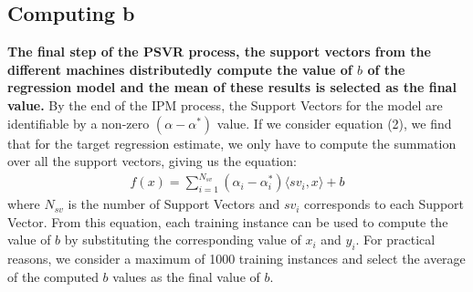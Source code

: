 \documentclass[12pt]{article}
\begin{document}
\subsection{Computing b}
\label{Comuting B}
  {\bf The final step of the PSVR process, the support vectors from the different machines distributedly compute the value of $b$ of the regression model and the mean of these results is selected as the final value.}
  \newline\newline
By the end of the IPM process, the Support Vectors for the model are identifiable by a non-zero $(\alpha - \alpha^*)$ value. If we consider equation (2), we find that for the target regression estimate, we only have to compute the summation over all the support vectors, giving us the equation:
\begin{gather*}
f(x) = \sum_{i=1}^{N_{sv}}{(\alpha_{i} - \alpha^*_{i}) \langle sv_{i}, x \rangle} + b
\end{gather*}
where $N_{sv}$ is the number of Support Vectors and $sv_{i}$ corresponds to each Support Vector. From this equation, each training instance can be used to compute the value of $b$ by substituting the corresponding value of $x_{i}$ and $y_{i}$.
\newline For practical reasons, we consider a maximum of 1000 training instances and select the average of the computed $b$ values as the final value of $b$.
\cleardoublepage
\end{document}
